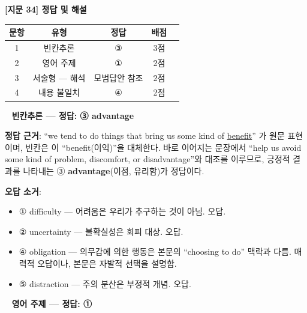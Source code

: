 \documentclass[11pt,a4paper]{article}
\newcommand{\qno}[1]{\par\vspace{10pt}\noindent{\sffamily\bfseries #1.}\ }
\begin{document}
\begin{center}
{\fontsize{15}{17}\selectfont\sffamily\bfseries [지문 34] 정답 및 해설}
\end{center}
\vspace{6pt}

\begin{center}
\renewcommand{\arraystretch}{1.4}
\begin{tabular}{ccccc}
\toprule
문항 & 유형 & 정답 & 배점 \\
\midrule
1 & 빈칸추론 & ③ & 3점 \\
2 & 영어 주제 & ① & 2점 \\
3 & 서술형 — 해석 & 모범답안 참조 & 2점 \\
4 & 내용 불일치 & ④ & 2점 \\
\bottomrule
\end{tabular}
\end{center}

\vspace{8pt}

\qno{1} \textsf{\bfseries 빈칸추론 — 정답: ③ advantage}

\begin{pbox}
\textbf{정답 근거}: ``we tend to do things that bring us some kind of \underline{benefit}'' 가 원문 표현이며, 빈칸은 이 ``benefit(이익)''을 대체한다. 바로 이어지는 문장에서 ``help us avoid some kind of problem, discomfort, or disadvantage''와 대조를 이루므로, 긍정적 결과를 나타내는 ③ \textbf{advantage}(이점, 유리함)가 정답이다.

\medskip
\textbf{오답 소거}:
\begin{itemize}[leftmargin=1.5em,itemsep=1pt,topsep=2pt]
  \item ① difficulty — 어려움은 우리가 추구하는 것이 아님. 오답.
  \item ② uncertainty — 불확실성은 회피 대상. 오답.
  \item ④ obligation — 의무감에 의한 행동은 본문의 ``choosing to do'' 맥락과 다름. 매력적 오답이나, 본문은 자발적 선택을 설명함.
  \item ⑤ distraction — 주의 분산은 부정적 개념. 오답.
\end{itemize}
\end{pbox}

\qno{2} \textsf{\bfseries 영어 주제 — 정답: ①}
\end{document}
